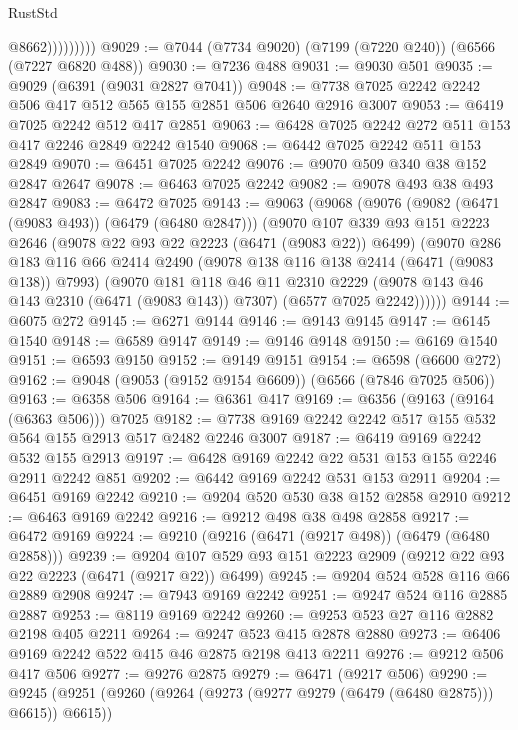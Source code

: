 \begin{lexlean}{RustStd}
\begin{coremodule}
                      @8662)))))))))
@9029 := @7044 (@7734 @9020) (@7199 (@7220 @240)) (@6566 (@7227 @6820 @488))
@9030 := @7236 @488
@9031 := @9030 @501
@9035 := @9029 (@6391 (@9031 @2827 @7041))
@9048 := @7738 @7025 @2242 @2242 @506 @417 @512 @565 @155 @2851 @506 @2640 @2916 @3007
@9053 := @6419 @7025 @2242 @512 @417 @2851
@9063 := @6428 @7025 @2242 @272 @511 @153 @417 @2246 @2849 @2242 @1540
@9068 := @6442 @7025 @2242 @511 @153 @2849
@9070 := @6451 @7025 @2242
@9076 := @9070 @509 @340 @38 @152 @2847 @2647
@9078 := @6463 @7025 @2242
@9082 := @9078 @493 @38 @493 @2847
@9083 := @6472 @7025
@9143 := @9063
    (@9068
      (@9076
        (@9082 (@6471 (@9083 @493)) (@6479 (@6480 @2847)))
        (@9070
          @107
          @339
          @93
          @151
          @2223
          @2646
          (@9078 @22 @93 @22 @2223 (@6471 (@9083 @22)) @6499)
          (@9070
            @286
            @183
            @116
            @66
            @2414
            @2490
            (@9078 @138 @116 @138 @2414 (@6471 (@9083 @138)) @7993)
            (@9070
              @181
              @118
              @46
              @11
              @2310
              @2229
              (@9078 @143 @46 @143 @2310 (@6471 (@9083 @143)) @7307)
              (@6577 @7025 @2242))))))
@9144 := @6075 @272
@9145 := @6271 @9144
@9146 := @9143 @9145
@9147 := @6145 @1540
@9148 := @6589 @9147
@9149 := @9146 @9148
@9150 := @6169 @1540
@9151 := @6593 @9150
@9152 := @9149 @9151
@9154 := @6598 (@6600 @272)
@9162 := @9048 (@9053 (@9152 @9154 @6609)) (@6566 (@7846 @7025 @506))
@9163 := @6358 @506
@9164 := @6361 @417
@9169 := @6356 (@9163 (@9164 (@6363 @506))) @7025
@9182 := @7738 @9169 @2242 @2242 @517 @155 @532 @564 @155 @2913 @517 @2482 @2246 @3007
@9187 := @6419 @9169 @2242 @532 @155 @2913
@9197 := @6428 @9169 @2242 @22 @531 @153 @155 @2246 @2911 @2242 @851
@9202 := @6442 @9169 @2242 @531 @153 @2911
@9204 := @6451 @9169 @2242
@9210 := @9204 @520 @530 @38 @152 @2858 @2910
@9212 := @6463 @9169 @2242
@9216 := @9212 @498 @38 @498 @2858
@9217 := @6472 @9169
@9224 := @9210 (@9216 (@6471 (@9217 @498)) (@6479 (@6480 @2858)))
@9239 := @9204 @107 @529 @93 @151 @2223 @2909 (@9212 @22 @93 @22 @2223 (@6471 (@9217 @22)) @6499)
@9245 := @9204 @524 @528 @116 @66 @2889 @2908
@9247 := @7943 @9169 @2242
@9251 := @9247 @524 @116 @2885 @2887
@9253 := @8119 @9169 @2242
@9260 := @9253 @523 @27 @116 @2882 @2198 @405 @2211
@9264 := @9247 @523 @415 @2878 @2880
@9273 := @6406 @9169 @2242 @522 @415 @46 @2875 @2198 @413 @2211
@9276 := @9212 @506 @417 @506
@9277 := @9276 @2875
@9279 := @6471 (@9217 @506)
@9290 := @9245 (@9251 (@9260 (@9264 (@9273 (@9277 @9279 (@6479 (@6480 @2875))) @6615)) @6615))

\end{coremodule}
\end{lexlean}
